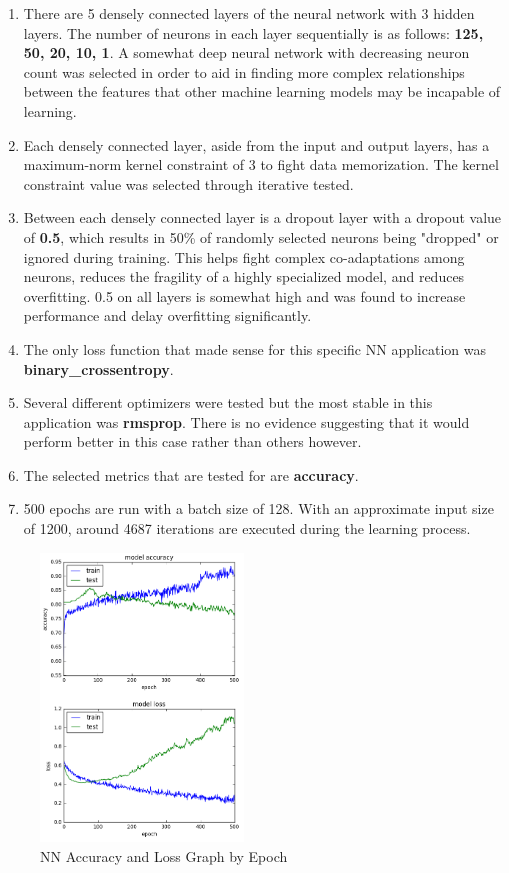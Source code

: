 \documentclass[11pt]{article}
\begin{document}
	\begin{enumerate}
		\item There are 5 densely connected layers of the neural network with 3 hidden layers. The number of neurons in each layer sequentially is as follows: \textbf{ 125, 50, 20, 10, 1}. A somewhat deep neural network with decreasing neuron count was selected in order to aid in finding more complex relationships between the features that other machine learning models may be incapable of learning.
		\item Each densely connected layer, aside from the input and output layers, has a maximum-norm kernel constraint of 3 to fight data memorization. The kernel constraint value was selected through iterative tested.
		\item Between each densely connected layer is a dropout layer with a dropout value of \textbf{0.5}, which results in 50\% of randomly selected neurons being "dropped" or ignored during training. This helps fight complex co-adaptations among neurons, reduces the fragility of a highly specialized model, and reduces overfitting. 0.5 on all layers is somewhat high and was found to increase performance and delay overfitting significantly.
		\item The only loss function that made sense for this specific NN application was  \textbf{binary\_crossentropy}.
		\item Several different optimizers were tested but the most stable in this application was \textbf{rmsprop}. There is no evidence suggesting that it would perform better in this case rather than others however.
		\item The selected metrics that are tested for are \textbf{accuracy}.
		\item 500 epochs are run with a batch size of 128. With an approximate input size of 1200, around 4687 iterations are executed during the learning process.
	\end{enumerate}

	\begin{figure}
		\begin{center}
			\includegraphics[width=0.48\textwidth]{ml_accuracy_loss.png}
		\end{center}
		\caption{NN Accuracy and Loss Graph by Epoch}
	\end{figure}
\end{document}
